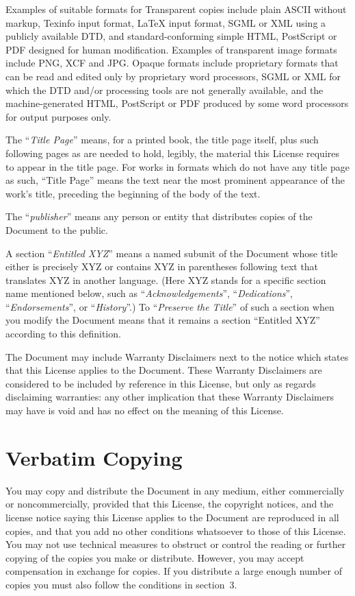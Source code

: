 Examples of suitable formats for Transparent copies include plain
ASCII without markup, Texinfo input format, LaTeX input format, SGML
or XML using a publicly available DTD, and standard-conforming simple
HTML, PostScript or PDF designed for human modification.  Examples of
transparent image formats include PNG, XCF and JPG.  Opaque formats
include proprietary formats that can be read and edited only by
proprietary word processors, SGML or XML for which the DTD and/or
processing tools are not generally available, and the
machine-generated HTML, PostScript or PDF produced by some word
processors for output purposes only.

The ``\textit{Title Page}'' means, for a printed book, the title page itself,
plus such following pages as are needed to hold, legibly, the material
this License requires to appear in the title page.  For works in
formats which do not have any title page as such, ``Title Page'' means
the text near the most prominent appearance of the work's title,
preceding the beginning of the body of the text.

The ``\textit{publisher}'' means any person or entity that distributes
copies of the Document to the public.

A section ``\textit{Entitled XYZ}'' means a named subunit of the Document whose
title either is precisely XYZ or contains XYZ in parentheses following
text that translates XYZ in another language.  (Here XYZ stands for a
specific section name mentioned below, such as ``\textit{Acknowledgements}'',
``\textit{Dedications}'', ``\textit{Endorsements}'', or ``\textit{History}''.)  
To ``\textit{Preserve the Title}''
of such a section when you modify the Document means that it remains a
section ``Entitled XYZ'' according to this definition.

The Document may include Warranty Disclaimers next to the notice which
states that this License applies to the Document.  These Warranty
Disclaimers are considered to be included by reference in this
License, but only as regards disclaiming warranties: any other
implication that these Warranty Disclaimers may have is void and has
no effect on the meaning of this License.

\section{Verbatim Copying}

You may copy and distribute the Document in any medium, either
commercially or noncommercially, provided that this License, the
copyright notices, and the license notice saying this License applies
to the Document are reproduced in all copies, and that you add no other
conditions whatsoever to those of this License.  You may not use
technical measures to obstruct or control the reading or further
copying of the copies you make or distribute.  However, you may accept
compensation in exchange for copies.  If you distribute a large enough
number of copies you must also follow the conditions in section~3.

